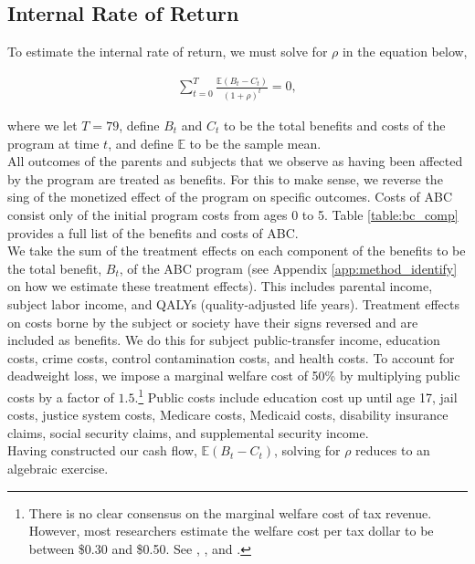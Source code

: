 \subsection{Internal Rate of Return}
\label{app:method_irr}

\noindent To estimate the internal rate of return, we must solve for $\rho$ in the equation below,

\begin{align}
\sum_{t=0}^T \frac{ \mathbb{E} (B_t - C_t)}{(1+\rho)^t} = 0,
\end{align}

\noindent where we let $T = 79$, define $B_t$ and $C_t$ to be the total benefits and costs of the
program at time $t$, and define $\mathbb{E}$ to be the sample mean. \\

\noindent All outcomes of the parents and subjects that we observe as having been affected by the program
are treated as benefits. For this to make sense, we reverse the sing of the monetized effect of the program
on specific outcomes. Costs of ABC consist only of the initial program costs from ages 0 to 5.
Table \ref{table:bc_comp} provides a full list of the benefits and costs of ABC. \\

\noindent We take the sum of the treatment effects on each component of the benefits to
be the total benefit, $B_t$, of the ABC program (see Appendix \ref{app:method_identify} on how
we estimate these treatment effects). This includes parental income, subject labor income, and QALYs
(quality-adjusted life years).
Treatment effects on costs borne by the subject or society have their signs
reversed and are included as benefits. We do this for subject public-transfer income,
education costs, crime costs,
control contamination costs, and health costs. To account for deadweight loss, we
impose a marginal welfare cost of 50\% by multiplying public costs by a factor of
$1.5$.\footnote{There is no clear consensus on the marginal welfare cost of tax revenue. However,
most researchers estimate the welfare cost per tax dollar to be between \$0.30 and \$0.50. See
\citet{Feldstein_1999_REStat}, \citet{Heckman_Smith_1998_evaluating}, and \citet{Browning_1987_AER}.} Public costs include education cost up until age 17, jail costs, justice system costs, Medicare costs,
Medicaid costs, disability insurance claims, social security claims, and supplemental security
income. \\

\noindent Having constructed our cash flow, $\mathbb{E} (B_t - C_t)$, solving for $\rho$
reduces to an algebraic exercise. \\

